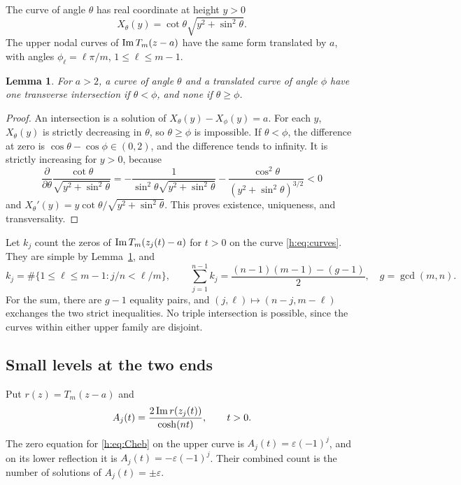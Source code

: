 \documentclass[UTF8,11pt]{ctexart}
\newtheorem{lem}[thm]{Lemma}
\theoremstyle{definition}
\numberwithin{equation}{section}
\newcommand{\eps}{\varepsilon}\newcommand{\ep}{\varepsilon}
\begin{document}
The curve of angle $\theta$ has real coordinate at height $y>0$
\[
 X_\theta(y)=\cot\theta\sqrt{y^2+\sin^2\theta}.
\]
The upper nodal curves of $\operatorname{Im} T_m(z-a)$ have the same form translated
by $a$, with angles $\phi_\ell=\ell\pi/m$, $1\le\ell\le m-1$.
\begin{lem}\label{h:lem:crossings}
For $a>2$, a curve of angle $\theta$ and a translated curve of angle
$\phi$ have one transverse intersection if $\theta<\phi$, and none
if $\theta\ge\phi$.
\end{lem}
\begin{proof}
An intersection is a solution of $X_\theta(y)-X_\phi(y)=a$.
For each $y$, $X_\theta(y)$ is strictly decreasing in $\theta$, so
$\theta\ge\phi$ is impossible. If $\theta<\phi$, the difference at zero
is $\cos\theta-\cos\phi\in(0,2)$, and the difference tends to infinity.
It is strictly increasing for $y>0$, because
\[
 \frac{\partial}{\partial\theta}
 \frac{\cot\theta}{\sqrt{y^2+\sin^2\theta}}
 =-\frac{1}{\sin^2\theta\sqrt{y^2+\sin^2\theta}}
  -\frac{\cos^2\theta}{(y^2+\sin^2\theta)^{3/2}}<0
\]
and $X_\theta'(y)=y\cot\theta/\sqrt{y^2+\sin^2\theta}$.
This proves existence, uniqueness, and transversality.
\end{proof}

Let $k_j$ count the zeros of $\operatorname{Im} T_m(z_j(t)-a)$ for $t>0$ on the curve
\eqref{h:eq:curves}. They are simple by Lemma~\ref{h:lem:crossings}, and
\begin{equation}\label{h:eq:kj}
 k_j=\#\{1\le\ell\le m-1:j/n<\ell/m\},
 \qquad
 \sum_{j=1}^{n-1}k_j
 =\frac{(n-1)(m-1)-(g-1)}2,
 \quad g=\gcd(m,n).
\end{equation}
For the sum, there are $g-1$ equality pairs, and
$(j,\ell)\mapsto(n-j,m-\ell)$ exchanges the two strict inequalities.
No triple intersection is possible, since the curves within either
upper family are disjoint.

\subsection{Small levels at the two ends}
Put $r(z)=T_m(z-a)$ and
\[
 A_j(t)=\frac{2\operatorname{Im} r(z_j(t))}{\cosh(nt)},\qquad t>0.
\]
The zero equation for \eqref{h:eq:Cheb} on the upper curve is
$A_j(t)=\eps(-1)^j$, and on its lower reflection it is
$A_j(t)=-\eps(-1)^j$. Their combined count is the number of solutions of
$A_j(t)=\pm\eps$.
\end{document}
